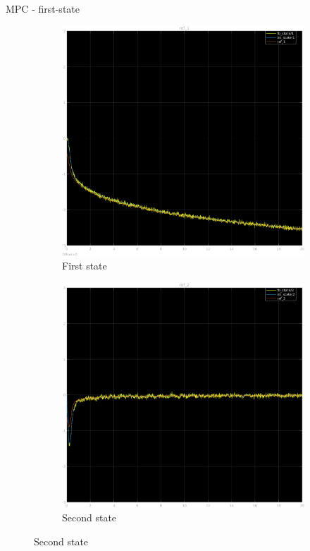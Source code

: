 \documentclass{beamer}
\begin{document}
\begin{frame}{MPC - first-state}
    \begin{figure}
        \centering
        \begin{subfigure}[b]{0.45\textwidth}
            \centering
            \includegraphics[width=\textwidth]{first_mpc_1.png}
            \caption{First state}
        \end{subfigure}
        \hfill
        \begin{subfigure}[b]{0.45\textwidth}
            \centering
            \includegraphics[width=\textwidth]{first_mpc_2.png}
            \caption{Second state}
        \end{subfigure}
    \end{figure}
\end{frame}
\end{document}
